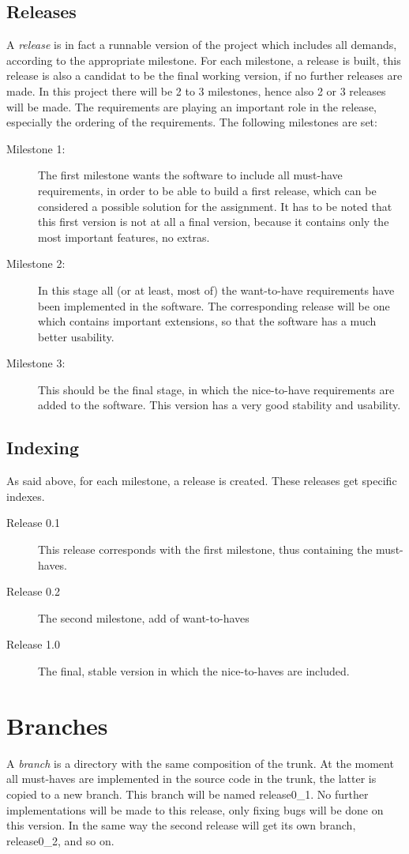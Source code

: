 \documentclass{report}
\begin{document}
\subsection{Releases}
A {\it release} is in fact a runnable version of the project which includes all demands, according to the appropriate milestone.
For each milestone, a release is built, this release is also a candidat to be the final working version, if no further releases are made.
In this project there will be 2 to 3 milestones, hence also 2 or 3 releases will be made.
The requirements are playing an important role in the release, especially the ordering of the requirements.
The following milestones are set:
\begin{description}
\item[Milestone 1:]
The first milestone wants the software to include all must-have requirements, in order to be able to build a first release, which can be considered a possible solution for the assignment.
It has to be noted that this first version is not at all a final version, because it contains only the most important features, no extras.
\item[Milestone 2:]
In this stage all (or at least, most of) the want-to-have requirements have been implemented in the software.
The corresponding release will be one which contains important extensions, so that the software has a much better usability.
\item[Milestone 3:]
This should be the final stage, in which the nice-to-have requirements are added to the software. This version has a very good stability and usability.
\end{description}
\subsection{Indexing}
As said above, for each milestone, a release is created. These releases get specific indexes.
\begin{description}
\item[Release 0.1]
This release corresponds with the first milestone, thus containing the must-haves.
\item[Release 0.2]
The second milestone, add of want-to-haves
\item[Release 1.0]
The final, stable version in which the nice-to-haves are included.
\end{description}
\section{Branches}
A {\it branch} is a directory with the same composition of the trunk.
At the moment all must-haves are implemented in the source code in the trunk, the latter is copied to a new branch.
This branch will be named release0\_1.
No further implementations will be made to this release, only fixing bugs will be done on this version.
In the same way the second release will get its own branch, release0\_2, and so on.


\end{document}
